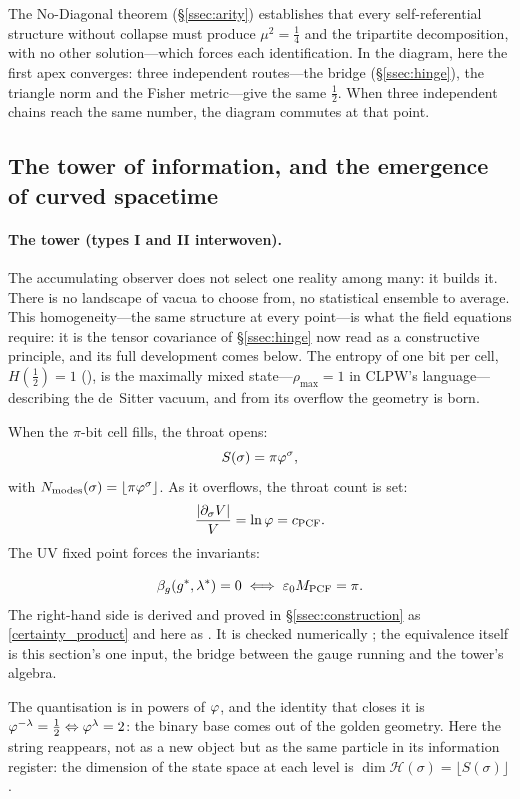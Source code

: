 The No-Diagonal theorem (\S\ref{ssec:arity}) establishes that every self-referential
structure without collapse must produce $\mu^2=\tfrac14$ and the tripartite
decomposition, with no other solution---which forces each identification. In the diagram,
here the first apex converges: three independent routes---the bridge (\S\ref{ssec:hinge}),
the triangle norm and the Fisher metric---give the same $\tfrac12$. When three independent
chains reach the same number, the diagram commutes at that point.

\subsection{The tower of information, and the emergence of curved spacetime}\label{ssec:accum}

\paragraph{The tower (types I and II interwoven).}
The accumulating observer does not select one reality among many: it builds it. There is
no landscape of vacua to choose from, no statistical ensemble to average. This
homogeneity---the same structure at every point---is what the field equations require: it
is the tensor covariance of \S\ref{ssec:hinge} now read as a constructive principle, and
its full development comes below. The entropy of one bit per cell, $H(\tfrac12)=1$
(), is the maximally mixed state---$\rho_{\max}=1$ in CLPW's
language---describing the de~Sitter vacuum, and from its overflow the geometry is born.

When the $\pi$-bit cell fills, the throat opens:
\begin{equation}\label{eq:obs-throat}
  S(\sigma)=\pi\varphi^{\sigma},
\end{equation}
with $N_{\rm modes}(\sigma)=\lfloor\pi\varphi^\sigma\rfloor$. As it overflows, the throat
count is set:
\begin{equation}\label{swampland_log_derivative}
  \frac{|\partial_\sigma V|}{V}=\ln\varphi=c_{\mathrm{PCF}} .
\end{equation}
The UV fixed point forces the invariants:
\begin{assumption}\label{asm:bridge}
\begin{equation}\label{eq:obs-fixedpoint}
  \beta_g(g^{*},\lambda^{*})=0\;\Longleftrightarrow\;\varepsilon_{0}M_{\mathrm{PCF}}=\pi .
\end{equation}
The right-hand side is derived and proved in \S\ref*{ssec:construction} as
\eqref{certainty_product} and here as . It is checked numerically ; the equivalence itself is
this section's one input, the bridge between the gauge running and the tower's algebra.
\end{assumption}
The quantisation is in powers of $\varphi$, and the identity that closes it is
$\varphi^{-\lambda}=\tfrac12\Leftrightarrow\varphi^\lambda=2$: the binary base comes out of
the golden geometry. Here the string reappears, not as a new object but as the same
particle in its information register: the dimension of the state space at each level is
$\dim\mathcal{H}(\sigma)=\lfloor S(\sigma)\rfloor$.

